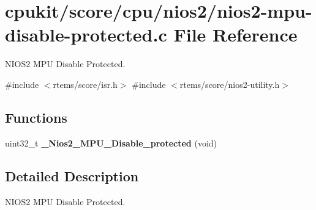 \hypertarget{nios2-mpu-disable-protected_8c}{}\section{cpukit/score/cpu/nios2/nios2-\/mpu-\/disable-\/protected.c File Reference}
\label{nios2-mpu-disable-protected_8c}


N\+I\+O\+S2 M\+PU Disable Protected.  


{\ttfamily \#include $<$rtems/score/isr.\+h$>$}\newline
{\ttfamily \#include $<$rtems/score/nios2-\/utility.\+h$>$}\newline
\subsection*{Functions}
\begin{DoxyCompactItemize}
\item 
\mbox{\label{nios2-mpu-disable-protected_8c_a65c6e0da6213e4da81c90afd614267be}} 
uint32\+\_\+t {\bfseries \+\_\+\+Nios2\+\_\+\+M\+P\+U\+\_\+\+Disable\+\_\+protected} (void)
\end{DoxyCompactItemize}


\subsection{Detailed Description}
N\+I\+O\+S2 M\+PU Disable Protected. 

